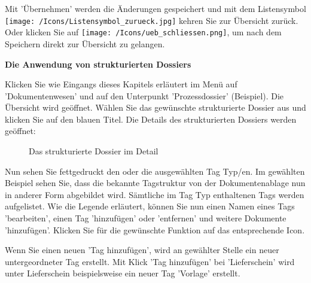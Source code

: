 Mit 'Übernehmen' werden die Änderungen gespeichert und mit dem Listensymbol \texttt{[image: /Icons/Listensymbol\_zurueck.jpg]} kehren Sie zur Übersicht zurück. Oder klicken Sie auf \texttt{[image: /Icons/ueb\_schliessen.png]}, um nach dem Speichern direkt zur Übersicht zu gelangen.

\vspace{.5cm}

\textbf{Die Anwendung von strukturierten Dossiers}

Klicken Sie wie Eingangs dieses Kapitels erläutert im Menü auf 'Dokumentenwesen' und auf den Unterpunkt 'Prozessdossier' (Beispiel). Die Übersicht wird geöffnet. Wählen Sie das gewünschte strukturierte Dossier aus und klicken Sie auf den blauen Titel. Die Details des strukturierten Dossiers werden geöffnet:

\begin{figure}[H]
  \vspace{-25pt}
\caption{Das strukturierte Dossier im Detail}
\end{figure}

Nun sehen Sie fettgedruckt den oder die ausgewählten Tag Typ/en. Im gewählten Beispiel sehen Sie, dass die bekannte Tagstruktur von der Dokumentenablage nun in anderer Form abgebildet wird. Sämtliche im Tag Typ enthaltenen Tags werden aufgelistet. Wie die Legende erläutert, können Sie nun einen Namen eines Tags 'bearbeiten', einen Tag 'hinzufügen' oder 'entfernen' und weitere Dokumente 'hinzufügen'. Klicken Sie für die gewünschte Funktion auf das entsprechende Icon.

\vspace{\baselineskip}

Wenn Sie einen neuen 'Tag hinzufügen', wird an gewählter Stelle ein neuer untergeordneter Tag erstellt. Mit Klick 'Tag hinzufügen' bei 'Lieferschein' wird unter Lieferschein beispielsweise ein neuer Tag 'Vorlage' erstellt.

